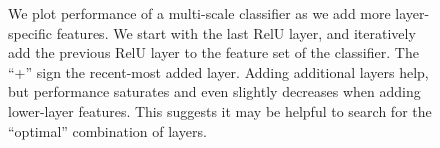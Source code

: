 \documentclass[10pt,twocolumn,letterpaper]{article}
\begin{document}

\begin{figure}[htbp]
\centering
\caption{We plot performance of a multi-scale classifier as we add more layer-specific features. We start with the last RelU layer, and iteratively add the previous RelU layer to the feature set of the classifier.
The ``+'' sign the recent-most added layer. Adding additional layers help, but performance saturates and even slightly decreases when adding lower-layer features. This suggests it may be helpful to search for the ``optimal'' combination of layers.}
\label{fig:add_back}
\end{figure}
\end{document}
